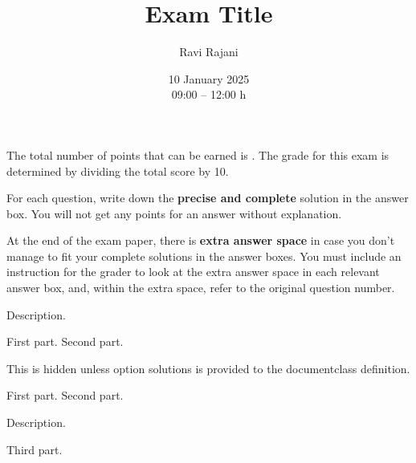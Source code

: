\totalpts[100]
\title{Exam Title}
\author{Ravi Rajani}
\date{10 January 2025\\ 09:00 -- 12:00 h}

\maketitle
\begin{instructions}
    \item The total number of points that can be earned is \totalpts. The grade for this exam is determined by dividing the total score by 10.

    \item For each question, write down the \textbf{precise and complete} solution in the answer box. You will not get any points for an answer without explanation.

    \item At the end of the exam paper, there is \textbf{extra answer space} in case you don't manage to fit your complete solutions in the answer boxes.
    You must include an instruction for the grader to look at the extra answer space in each relevant answer box, and, within the extra space, refer to the original question number.
\end{instructions}
\begin{question}[8]
    Description.
    \begin{subparts}
        \subpart[4] First part.
        \subpart[1] Second part.
    \end{subparts}
\end{question}
\begin{soltn}
    This is hidden unless option \textsf{solutions} is provided to the \textsf{documentclass} definition.
\end{soltn}
\begin{question}[10]
    \nodescription
    \begin{subparts}
        \subpart[5] First part.
        \subpart[5] Second part.
    \end{subparts}
    Description.
    \begin{subparts}[resume]
        \subpart[3] Third part.
    \end{subparts}
\end{question}
